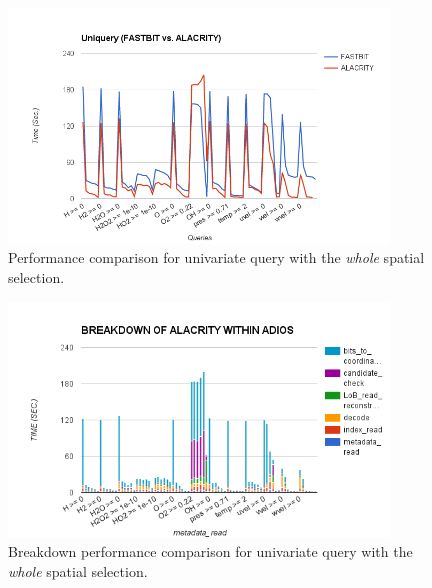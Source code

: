 \documentclass[11pt,a4paper]{article}
\begin{document}
\begin{figure}[ht]             
\begin{center}                 
    \includegraphics[width=0.90\textwidth]{figures/perf/alac-adios/uniquery-whole-space}
\end{center}
\caption{Performance comparison for univariate query with the \emph{whole} spatial selection.}
\label{fig:uniquery-whole}  
\end{figure}


\begin{figure}[ht]             
\begin{center}                 
    \includegraphics[width=0.90\textwidth]{figures/perf/alac-adios/breakdown-uniquery-whole-space}
\end{center}
\caption{Breakdown performance comparison for univariate query with the \emph{whole} spatial selection.}
\label{fig:uniquery-whole-breakdown}  
\end{figure}
\end{document}
